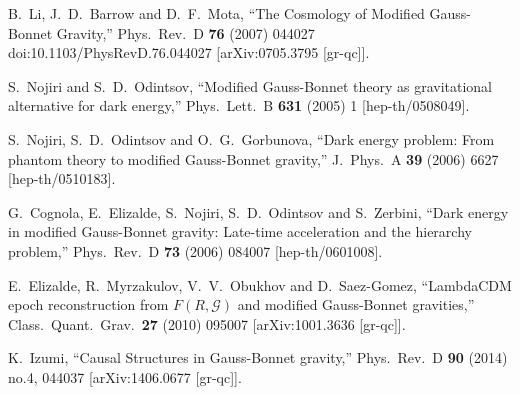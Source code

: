 \documentclass[aps,prd,twocolumn,groupedaddress,showpacs,nofootinbib,amssymb]{revtex4-2}
\begin{document}
\begin{thebibliography}{99}
  B.~Li, J.~D.~Barrow and D.~F.~Mota,
``The Cosmology of Modified Gauss-Bonnet Gravity,''
  Phys.\ Rev.\ D {\bf 76} (2007) 044027
  doi:10.1103/PhysRevD.76.044027
  [arXiv:0705.3795 [gr-qc]].





 S.~Nojiri and S.~D.~Odintsov,
``Modified Gauss-Bonnet theory as gravitational alternative for
dark energy,''
 Phys.\ Lett.\ B {\bf 631} (2005) 1
 [hep-th/0508049].


 S.~Nojiri, S.~D.~Odintsov and O.~G.~Gorbunova,
``Dark energy problem: From phantom theory to modified
Gauss-Bonnet gravity,''
 J.\ Phys.\ A {\bf 39} (2006) 6627
 [hep-th/0510183].

 G.~Cognola, E.~Elizalde, S.~Nojiri, S.~D.~Odintsov and S.~Zerbini,
``Dark energy in modified Gauss-Bonnet gravity: Late-time
acceleration and the hierarchy problem,''
 Phys.\ Rev.\ D {\bf 73} (2006) 084007
 [hep-th/0601008].

 E.~Elizalde, R.~Myrzakulov, V.~V.~Obukhov and D.~Saez-Gomez,
``LambdaCDM epoch reconstruction from $F(R,\mathcal{G})$ and
modified Gauss-Bonnet gravities,''
 Class.\ Quant.\ Grav.\ {\bf 27} (2010) 095007
 [arXiv:1001.3636 [gr-qc]].





 K.~Izumi,
``Causal Structures in Gauss-Bonnet gravity,''
 Phys.\ Rev.\ D {\bf 90} (2014) no.4, 044037
 [arXiv:1406.0677 [gr-qc]].



\end{thebibliography}
\end{document}
